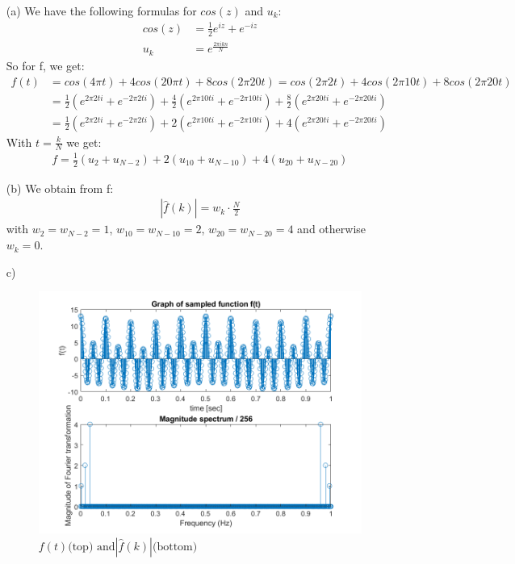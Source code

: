 \documentclass[12pt]{article}
\begin{document}
\begin{itemize}
    \item[(a)] We have the following formulas for $cos(z)$ and $u_k$:
    \begin{align*}
      cos(z) &= \frac{1}{2} e^{iz} + e^{-iz} \\
      u_k &= e^{\frac{2 \pi i k n}{N}}
    \end{align*}
    So for f, we get:
    \begin{align*}
      f(t) &= cos(4\pi t) + 4 cos(20\pi t) + 8 cos(2\pi 20 t) = cos(2\pi 2 t) + 4 cos(2\pi 10 t) + 8 cos(2\pi 20 t)\\
      &= \frac{1}{2} \left( e^{2 \pi 2 t i} + e^{-2 \pi 2 t i} \right) + \frac{4}{2} \left( e^{2 \pi 10 t i} + e^{-2 \pi 10 t i} \right) + \frac{8}{2} \left( e^{2 \pi 20 t i} + e^{-2 \pi 20 t i} \right)\\
      &= \frac{1}{2} \left( e^{2 \pi 2 t i} + e^{-2 \pi 2 t i} \right) + 2 \left( e^{2 \pi 10 t i} + e^{-2 \pi 10 t i} \right) + 4 \left( e^{2 \pi 20 t i} + e^{-2 \pi 20 t i} \right)
    \end{align*}
    With $t=\frac{k}{N}$ we get:
    \begin{align*}
      f = \frac{1}{2} \left(u_2 + u_{N-2} \right) + 2 \left( u_{10} + u_{N-10} \right) + 4 \left(u_{20} + u_{N-20} \right)
    \end{align*}
      \item[(b)] We obtain from f:
      \begin{align*}
        |\hat f(k)|=w_k \cdot \frac{N}{2}
      \end{align*}
      with $w_2=w_{N-2}=1$, $w_{10}=w_{N-10}=2$, $w_{20}=w_{N-20}=4$ and otherwise $w_k=0$.
      \item[c)]
      \begin{figure}[h]
          \centering
          \includegraphics[width=1.1\textwidth]{Sheet3Exercise1.png}
          \caption{$f(t) \text{(top) and} |\hat f(k)| \text{(bottom)}$}
          \label{abb}
      \end{figure}
\end{itemize}
\end{document}
